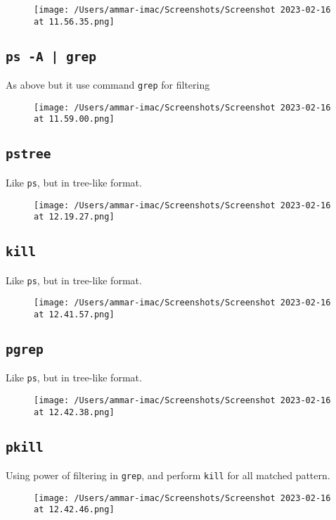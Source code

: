 \documentclass{article}
\def\code#1{\texttt{#1}}
\begin{document}
\begin{figure}[ht]
  \centering
  \texttt{[image: /Users/ammar-imac/Screenshots/Screenshot 2023-02-16 at 11.56.35.png]}
\end{figure}


\subsection{\code{ps -A | grep}}%
As above but it use command \code{grep} for filtering
\begin{figure}[ht]
  \centering
  \texttt{[image: /Users/ammar-imac/Screenshots/Screenshot 2023-02-16 at 11.59.00.png]}
\end{figure}


\newpage


\subsection{\code{pstree}}%
Like \code{ps}, but in  tree-like format.
\begin{figure}[ht]
  \centering
  \texttt{[image: /Users/ammar-imac/Screenshots/Screenshot 2023-02-16 at 12.19.27.png]}
\end{figure}

\subsection{\code{kill}}%
Like \code{ps}, but in  tree-like format.
\begin{figure}[ht]
  \centering
  \texttt{[image: /Users/ammar-imac/Screenshots/Screenshot 2023-02-16 at 12.41.57.png]}
\end{figure}

\subsection{\code{pgrep}}%
Like \code{ps}, but in  tree-like format.
\begin{figure}[ht]
  \centering
  \texttt{[image: /Users/ammar-imac/Screenshots/Screenshot 2023-02-16 at 12.42.38.png]}
\end{figure}

\newpage


\subsection{\code{pkill}}%
Using power of filtering in \code{grep}, and perform \code{kill} for all matched pattern.
\begin{figure}[ht]
  \centering
  \texttt{[image: /Users/ammar-imac/Screenshots/Screenshot 2023-02-16 at 12.42.46.png]}
\end{figure}
\end{document}

